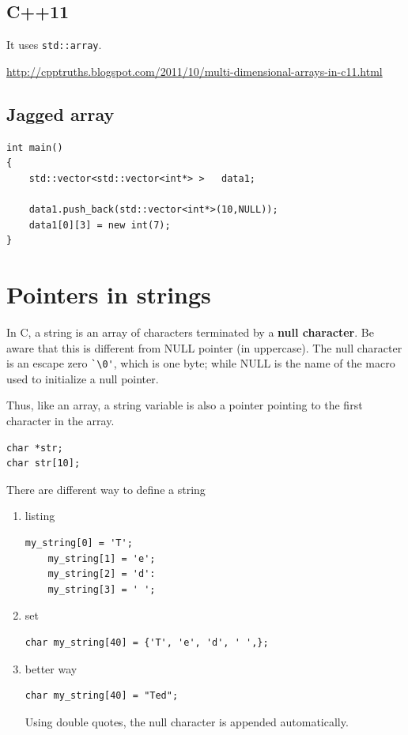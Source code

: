 \subsection{C++11}

It uses \verb!std::array!.

\url{http://cpptruths.blogspot.com/2011/10/multi-dimensional-arrays-in-c11.html}

\subsection{Jagged array}

\begin{lstlisting}
int main()
{
    std::vector<std::vector<int*> >   data1;

    data1.push_back(std::vector<int*>(10,NULL));
    data1[0][3] = new int(7);
}
\end{lstlisting}

\section{Pointers in strings}
\label{sec:pointers-strings}

In C, a string is an array of characters terminated by a
{\bf null character}. Be aware that this is different from NULL
pointer (in uppercase). The null character is an escape zero
\verb!`\0'!, which is one byte; while NULL is the name of the macro
used to initialize a null pointer. 

Thus, like an array, a string variable is also a pointer pointing to
the first character in the array.
\begin{lstlisting}
char *str;
char str[10];
\end{lstlisting}

There are different way to define a string
\begin{enumerate}
\item listing
\begin{lstlisting}
my_string[0] = 'T';
    my_string[1] = 'e';
    my_string[2] = 'd':
    my_string[3] = ' ';

\end{lstlisting}

\item set
\begin{lstlisting}
char my_string[40] = {'T', 'e', 'd', ' ',};
\end{lstlisting}
\item better way
\begin{lstlisting}
char my_string[40] = "Ted";
\end{lstlisting}
Using double quotes, the null character is appended automatically.
\end{enumerate}

